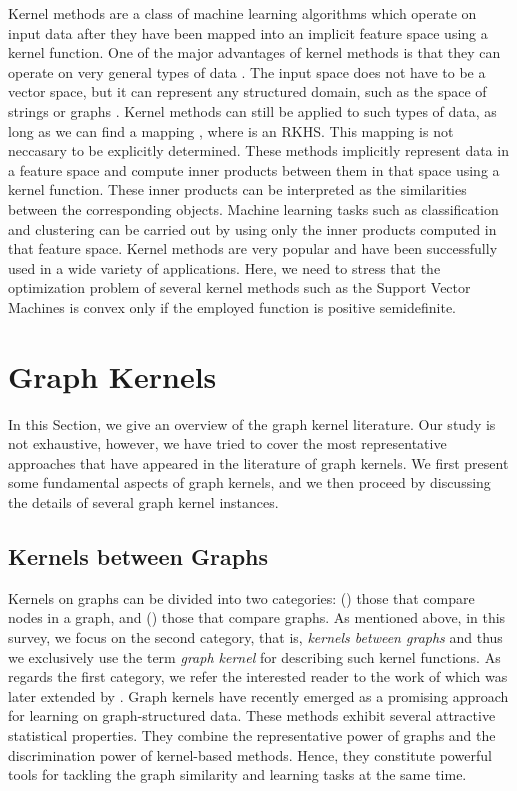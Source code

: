 \documentclass[twoside,11pt]{article}
\begin{document}
Kernel methods are a class of machine learning algorithms which operate on input data after they have been mapped into an implicit feature space using a kernel function.
One of the major advantages of kernel methods is that they can operate on very general types of data .
The input space  does not have to be a vector space, but it can represent any structured domain, such as the space of strings or graphs .
Kernel methods can still be applied to such types of data, as long as we can find a mapping , where  is an RKHS.
This mapping is not neccasary to be explicitly determined. 
These methods implicitly represent data in a feature space and compute inner products between them in that space using a kernel function.
These inner products can be interpreted as the similarities between the corresponding objects.
Machine learning tasks such as classification and clustering can be carried out by using only the inner products computed in that feature space.
Kernel methods are very popular and have been successfully used in a wide variety of applications.
Here, we need to stress that the optimization problem of several kernel methods such as the Support Vector Machines is convex only if the employed function is positive semidefinite.








\section{Graph Kernels}\label{sec:graph_kernels}
In this Section, we give an overview of the graph kernel literature.
Our study is not exhaustive, however, we have tried to cover the most representative approaches that have appeared in the literature of graph kernels.
We first present some fundamental aspects of graph kernels, and we then proceed by discussing the details of several graph kernel instances.

\subsection{Kernels between Graphs}
Kernels on graphs can be divided into two categories: () those that compare nodes in a graph, and () those that compare graphs.
As mentioned above, in this survey, we focus on the second category, that is, \textit{kernels between graphs} and thus we exclusively use the term \textit{graph kernel }for describing such kernel functions.
As regards the first category, we refer the interested reader to the work of  which was later extended by .
Graph kernels have recently emerged as a promising approach for learning on graph-structured data.
These methods exhibit several attractive statistical properties.
They combine the representative power of graphs and the discrimination power of kernel-based methods.
Hence, they constitute powerful tools for tackling the graph similarity and learning tasks at the same time.
\end{document}
